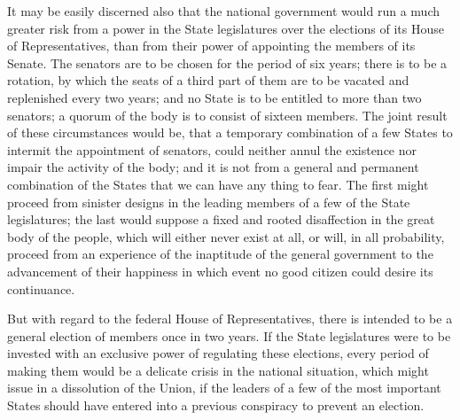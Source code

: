 It may be easily discerned also that the national government would run a much greater risk from a power in the State legislatures over the elections of its House of Representatives, than from their power of appointing the members of its Senate. The senators are to be chosen for the period of six years; there is to be a rotation, by which the seats of a third part of them are to be vacated and replenished every two years; and no State is to be entitled to more than two senators; a quorum of the body is to consist of sixteen members. The joint result of these circumstances would be, that a temporary combination of a few States to intermit the appointment of senators, could neither annul the existence nor impair the activity of the body; and it is not from a general and permanent combination of the States that we can have any thing to fear. The first might proceed from sinister designs in the leading members of a few of the State legislatures; the last would suppose a fixed and rooted disaffection in the great body of the people, which will either never exist at all, or will, in all probability, proceed from an experience of the inaptitude of the general government to the advancement of their happiness in which event no good citizen could desire its continuance.

But with regard to the federal House of Representatives, there is intended to be a general election of members once in two years. If the State legislatures were to be invested with an exclusive power of regulating these elections, every period of making them would be a delicate crisis in the national situation, which might issue in a dissolution of the Union, if the leaders of a few of the most important States should have entered into a previous conspiracy to prevent an election.

